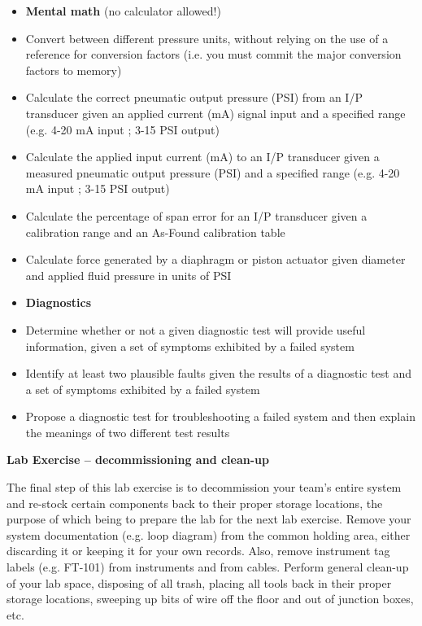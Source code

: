 \filbreak

\begin{itemize}
\item {\bf Mental math} (no calculator allowed!)
\item Convert between different pressure units, without relying on the use of a reference for conversion factors (i.e. you must commit the major conversion factors to memory)
\item Calculate the correct pneumatic output pressure (PSI) from an I/P transducer given an applied current (mA) signal input and a specified range (e.g. 4-20 mA input ; 3-15 PSI output)
\item Calculate the applied input current (mA) to an I/P transducer given a measured pneumatic output pressure (PSI) and a specified range (e.g. 4-20 mA input ; 3-15 PSI output) 
\item Calculate the percentage of span error for an I/P transducer given a calibration range and an As-Found calibration table 
\item Calculate force generated by a diaphragm or piston actuator given diameter and applied fluid pressure in units of PSI
\end{itemize}

\filbreak

\begin{itemize}
\item {\bf Diagnostics}
\item Determine whether or not a given diagnostic test will provide useful information, given a set of symptoms exhibited by a failed system
\item Identify at least two plausible faults given the results of a diagnostic test and a set of symptoms exhibited by a failed system
\item Propose a diagnostic test for troubleshooting a failed system and then explain the meanings of two different test results
\end{itemize}



\vfil \eject

\noindent
{\bf Lab Exercise -- decommissioning and clean-up}

\vskip 5pt

The final step of this lab exercise is to decommission your team's entire system and re-stock certain components back to their proper storage locations, the purpose of which being to prepare the lab for the next lab exercise.  Remove your system documentation (e.g. loop diagram) from the common holding area, either discarding it or keeping it for your own records.  Also, remove instrument tag labels (e.g. FT-101) from instruments and from cables.  Perform general clean-up of your lab space, disposing of all trash, placing all tools back in their proper storage locations, sweeping up bits of wire off the floor and out of junction boxes, etc.

